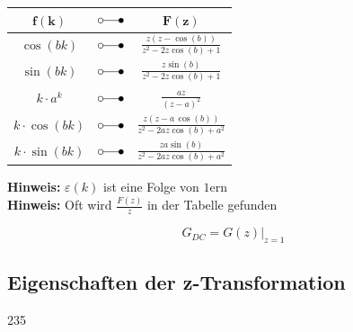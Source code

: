\begin{minipage}[t]{0.54\columnwidth}
    \begin{center}
        \renewcommand{\arraystretch}{1.4}
        \begin{tabular}{c c c}
            \toprule
            $\bm{f(k)}$                             & $\laplace$    & $\bm{F(z)}$                                           \\
            \midrule
            $\cos(bk)$                              & $\laplace$    & $\frac{z(z - \cos(b))}{z^2 - 2z \cos(b) + 1}$         \\
            \midrule
            $\sin(bk)$                              & $\laplace$    & $\frac{z \sin(b)}{z^2 - 2z \cos(b) + 1}$              \\
            \midrule
            $k \cdot a^k$                           & $\laplace$    & $\frac{az}{(z-a)^2}$                                  \\
            \midrule
            $k \cdot \cos(bk)$                      & $\laplace$    & $\frac{z(z - a \,\cos(b))}{z^2 - 2az \cos(b) + a^2}$  \\
            \midrule
            $k \cdot \sin(bk)$                      & $\laplace$    & $\frac{z a \sin(b)}{z^2 - 2az \cos(b) + a^2}$         \\
            \bottomrule
        \end{tabular}
        \renewcommand{\arraystretch}{1}
    \end{center}
\end{minipage}

\smallskip

\textbf{Hinweis:} $\varepsilon(k)$ ist eine Folge von $1$ern \\
\textbf{Hinweis:} Oft wird $\frac{F(z)}{z}$ in der Tabelle gefunden


\[
G_{DC}
=
G(z)\Big|_{z=1}
\]

\subsection{Eigenschaften der z-Transformation}{235}
\label{Eigenschaften der z-Transformation}

